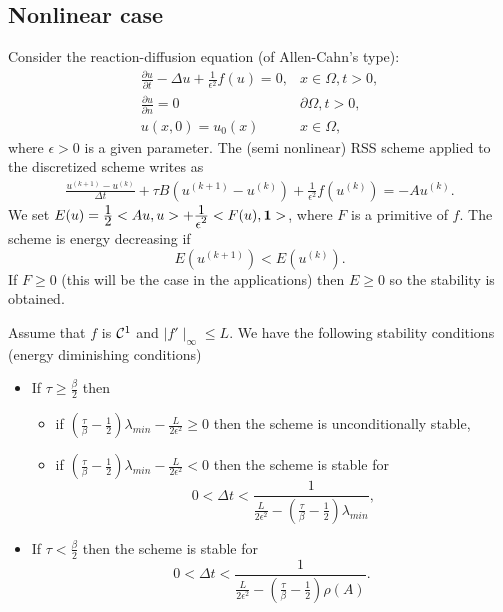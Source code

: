 \documentclass[hyperref={pdfpagemode=FullScreen},9pt]{beamer}
\newcommand{\Frac}[2] {\frac{\textstyle #1} {\textstyle #2}}
\begin{document}
\subsection{Nonlinear case}
\begin{frame}
Consider the reaction-diffusion equation (of Allen-Cahn's type):
\begin{eqnarray}
\Frac{\partial u}{\partial t} -\Delta u +\Frac{1}{\epsilon^2}f(u)=0, & x\in \Omega, t>0,\\
\Frac{\partial u}{\partial n}= 0 & \partial \Omega , t>0,\\
u(x,0)=u_0(x) & x\in \Omega ,
\end{eqnarray}
 where $\epsilon >0$ is a given parameter. The (semi nonlinear) RSS scheme applied to the discretized scheme writes as
\begin{eqnarray}
 \Frac{u^{(k+1)}-u^{(k)}}{\Delta t} +\tau B (u^{(k+1)}-u^{(k)}) +\Frac{1}{\epsilon^2}f(u^{(k)}) =-Au^{(k)}.
 \label{RSSAC}
 \end{eqnarray}
  We set $E(u)=\Frac{1}{2}<Au,u>+\Frac{1}{\epsilon^2}<F(u),{\bf 1}>$, where $F$ is a primitive of $f$.
  The scheme is energy decreasing if
 $$
 E(u^{(k+1)}) < E(u^{(k)}).
 $$
 If $F\ge 0$ (this will be the case in the applications) then $E\ge 0$ so the stability is obtained.
 \end{frame}
%
 \begin{frame}
 \begin{theorem}
Assume that $f$ is ${\cal C}^1$ and $\mid f'\mid_{\infty}\le L$. We have the following stability conditions
(energy diminishing conditions)
\begin{itemize}
\item If $\tau\ge \Frac{\beta}{2}$ then
\begin{itemize}
\item if $\left(\Frac{\tau}{\beta}-\Frac{1}{2}\right)\lambda_{min} -\Frac{L}{2\epsilon^2}\ge 0$ then the scheme is unconditionally stable,
\item if $\left(\Frac{\tau}{\beta}-\Frac{1}{2}\right)\lambda_{min} -\Frac{L}{2\epsilon^2}< 0$ then the scheme is stable for
$$
0<\Delta t <\Frac{1}{\Frac{L}{2\epsilon^2} -\left(\Frac{\tau}{\beta}-\Frac{1}{2}\right)\lambda_{min}},
$$
\end{itemize}
\item If $\tau < \Frac{\beta}{2}$ then the scheme is stable for
$$
0<\Delta t <\Frac{1}{\Frac{L}{2\epsilon^2} -\left(\Frac{\tau}{\beta}-\Frac{1}{2}\right)\rho(A)}.
$$
\end{itemize} 
\label{Stab_AC}
\end{theorem}
\end{frame}
%
\end{document}
